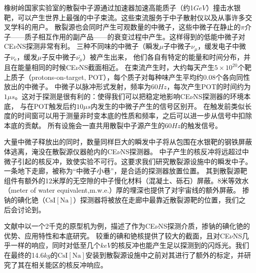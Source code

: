 \begin{translation}
橡树岭国家实验室的散裂中子源通过加速器加速高能质子（约1$\si{GeV}$）撞击水银靶，可以产生世界上最强的中子束流。这些束流服务于中子散射仪以及从事许多交叉学科的用户。
散裂源也会同时产生可观数量的中微子，这些中微子在静止的$\pi$介子——质子相互作用的副产品——的衰变过程中产生。这样得到的低能中微子对CE$\nu$NS探测非常有利。
三种不同味的中微子（瞬发$\mu$子中微子$\nu_\mu$，缓发电子中微子$\nu_\mathrm{e}$，缓发$\mu$子反中微子$\bar{\nu_\mu}$）被产生出来，
他们各自有特定的能量和时间分布，并且在能量相同的时候CE$\nu$NS截面相近。
在束流产生时，大约每天产生$5\times10^{20}$个靶上质子（protons-on-target, POT），每个质子对每种味产生平均约0.08个各向同性放出的中微子。
中微子以脉冲形式发射，频率为$60\si{Hz}$，每次产生POT的时间约为$1\mu\si{s}$。这对于探测是很有利的：使得我们可以把稳定地影响CE$\nu$NS探测器的环境本底，
与在POT触发后约$10\mu\si{s}$内发生的中微子产生的信号区别开。
在触发前类似长度的时间窗可以用于测量非时变本底的性质和频率，之后可以进一步从信号中扣除本底的贡献。
所有设施会一直共用散裂中子源产生的$60\si{Hz}$的触发信号。

大量中微子释放出的同时，数量同样巨大的瞬发中子将从包围在水银靶的钢铁屏蔽体逃离，淹没在散裂源仪器舱内的CE$\nu$NS探测器。
中子产生的核反冲将远超过中微子引起的核反冲，致使实验不可行。这要求我们研究散裂源设施中的瞬发中子。一条地下走廊，被称为``中微子小巷''，是合适的探测器放置位置。
其到散裂源靶组件有额外的12米厚的无空隙的中子慢化材料（混凝土、砾石）屏蔽。8米等效水（meter of water equivalent,m.w.e.）厚的埋深也提供了对宇宙线的额外屏蔽。
掺钠的碘化铯（$\mathrm{CsI[Na]}$）探测器将被放在走廊中最靠近散裂源靶的位置，我们之后会讨论到。

文献中以一个2千克的原型机为例，描述了作为CE$\nu$NS探测介质，掺钠的碘化铯的优势、应用特性和本底研究。
较重的碘和铯核提供了较大的截面，且对CE$\nu$NS几乎一样的响应，同时对低至几个$\si{keV}$的核反冲也能产生足以探测到的闪烁光。我们在最终的14.6$\si{kg}$的$\mathrm{CsI[Na]}$安装到散裂源设施中之前对其进行了额外的标定，并研究了其在相关能区的核反冲响应。




\begin{translation-index}
  \nocite{akimov_observation_2017}
  
  
\end{translation-index}

\end{translation}
